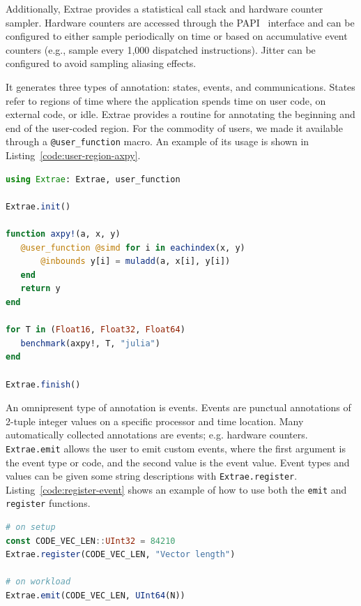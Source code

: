 \documentclass{juliacon}
\begin{document}
Additionally, Extrae provides a statistical call stack and hardware counter sampler.
Hardware counters are accessed through the PAPI~\cite{browne2000portable} interface and can be configured to either sample periodically on time or based on accumulative event counters (e.g., sample every 1,000 dispatched instructions).
Jitter can be configured to avoid sampling aliasing effects.

It generates three types of annotation: states, events, and communications. States refer to regions of time where the application spends time on user code, on external code, or idle. Extrae provides a routine for annotating the beginning and end of the user-coded region. For the commodity of users, we made it available through a \texttt{@user\_function} macro. An example of its usage is shown in Listing~\ref{code:user-region-axpy}.

\begin{lstlisting}[language=Julia, label=code:user-region-axpy, caption={Usage example of \texttt{@user\_function} in a benchmark for the \texttt{axpy!} routine.}]
using Extrae: Extrae, user_function

Extrae.init()

function axpy!(a, x, y)
   @user_function @simd for i in eachindex(x, y)
       @inbounds y[i] = muladd(a, x[i], y[i])
   end
   return y
end

for T in (Float16, Float32, Float64)
   benchmark(axpy!, T, "julia")
end

Extrae.finish()
\end{lstlisting}

An omnipresent type of annotation is events. Events are punctual annotations of 2-tuple integer values on a specific processor and time location.
Many automatically collected annotations are events; e.g. hardware counters.
\texttt{Extrae.emit} allows the user to emit custom events, where the first argument is the event type or code, and the second value is the event value.
Event types and values can be given some string descriptions with \texttt{Extrae.register}.
Listing~\ref{code:register-event} shows an example of how to use both the \texttt{emit} and \texttt{register} functions.

\begin{lstlisting}[language=Julia, label=code:register-event, caption={Usage example of event registration and emition.}]
# on setup
const CODE_VEC_LEN::UInt32 = 84210
Extrae.register(CODE_VEC_LEN, "Vector length")

# on workload
Extrae.emit(CODE_VEC_LEN, UInt64(N))
\end{lstlisting}
\end{document}
